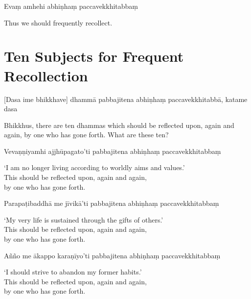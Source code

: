 Evaṃ amhehi abhiṇhaṃ paccavekkhitabbaṃ

\begin{english}
  Thus we should frequently recollect.\\
\end{english}

\section{Ten Subjects for Frequent Recollection}


\begin{leader}
\end{leader}

[Dasa ime bhikkhave] dhammā pabbajitena abhiṇhaṃ paccavekkhitabbā, katame dasa

\begin{english}
  Bhikkhus, there are ten dhammas which should be reflected upon, again and again, by one who has gone forth. What are these ten?
\end{english}

Vevaṇṇiyamhi ajjhūpagato'ti pabbajitena abhiṇhaṃ paccavekkhitabbaṃ

\begin{english}
  `I am no longer living according to worldly aims and values.'\\
  This should be reflected upon, again and again,\\
  by one who has gone forth.
\end{english}

Parapaṭibaddhā me jīvikā'ti pabbajitena abhiṇhaṃ paccavekkhitabbaṃ

\begin{english}
  `My very life is sustained through the gifts of others.'\\
  This should be reflected upon, again and again,\\
  by one who has gone forth.
\end{english}

Añño me ākappo karaṇīyo'ti pabbajitena abhiṇhaṃ paccavekkhitabbaṃ

\begin{english}
  `I should strive to abandon my former habits.'\\
  This should be reflected upon, again and again,\\
  by one who has gone forth.
\end{english}

